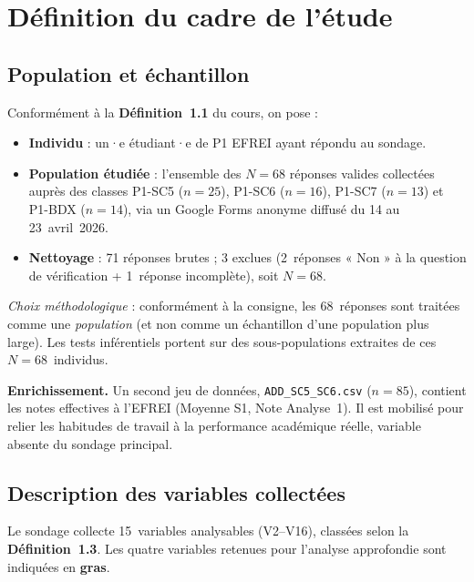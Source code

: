 
\section{Définition du cadre de l'étude}

\subsection{Population et échantillon}

Conformément à la \textbf{Définition~1.1} du cours, on pose :
\begin{itemize}
  \item \textbf{Individu} : un·e étudiant·e de P1 EFREI ayant répondu au sondage.
  \item \textbf{Population étudiée} : l'ensemble des $N = 68$ réponses valides collectées auprès des classes P1-SC5 ($n=25$), P1-SC6 ($n=16$), P1-SC7 ($n=13$) et P1-BDX ($n=14$), via un Google Forms anonyme diffusé du 14 au 23~avril~2026.
  \item \textbf{Nettoyage} : 71 réponses brutes ; 3 exclues (2~réponses « Non » à la question de vérification + 1~réponse incomplète), soit $N = 68$.
\end{itemize}

\textit{Choix méthodologique} : conformément à la consigne, les 68~réponses sont traitées comme une \emph{population} (et non comme un échantillon d'une population plus large). Les tests inférentiels portent sur des sous-populations extraites de ces $N = 68$~individus.

\medskip
\textbf{Enrichissement.} Un second jeu de données, \texttt{ADD\_SC5\_SC6.csv} ($n = 85$), contient les notes effectives à l'EFREI (Moyenne S1, Note Analyse~1). Il est mobilisé pour relier les habitudes de travail à la performance académique réelle, variable absente du sondage principal.

\subsection{Description des variables collectées}

Le sondage collecte 15~variables analysables (V2–V16), classées selon la \textbf{Définition~1.3}. Les quatre variables retenues pour l'analyse approfondie sont indiquées en \textbf{gras}.

